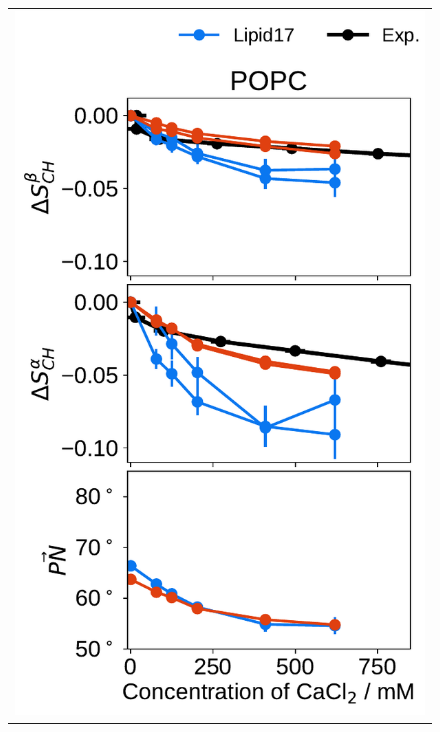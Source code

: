 \documentclass[journal=jpcbfk,manuscript=article]{achemso}
\newlength{\figheightsmall}
\newlength{\figheight}
\begin{document}
\begin{figure}[tbp!]
\begin{tabular}{ c }
  \includegraphics[height=\figheightsmall]{../img/ecc_pops/order_parameters_changes_ecc-lip_L14_A-B-PN-COO_POPC_cacl.pdf} 

\end{tabular}
\end{figure}
\end{document}
